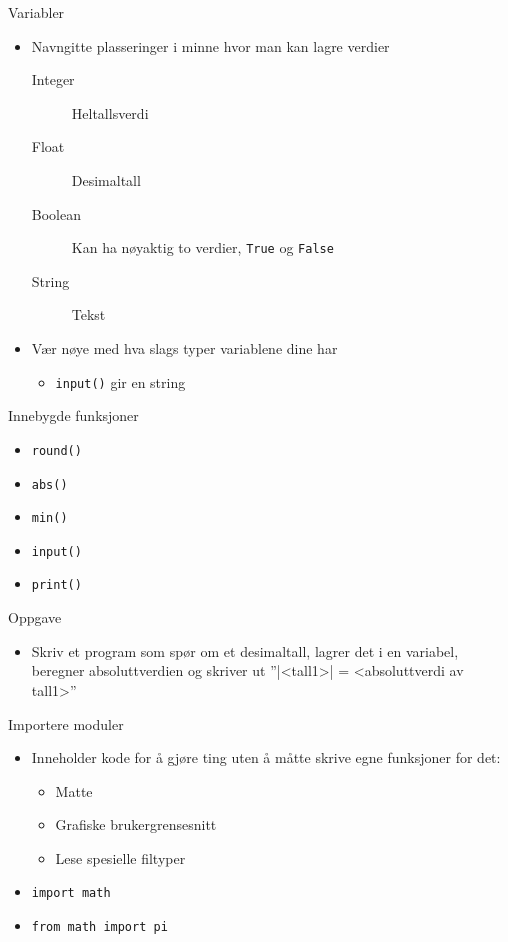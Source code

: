 \documentclass[screen, aspectratio=169]{beamer}
\begin{document}
\begin{frame}[fragile]{Variabler}
	\begin{itemize}
		\item Navngitte plasseringer i minne hvor man kan lagre verdier
		\begin{description}
			\item[Integer] Heltallsverdi
			\item[Float] Desimaltall
			\item[Boolean] Kan ha nøyaktig to verdier, \lstinline|True| og \lstinline|False|
			\item[String] Tekst
		\end{description}
		\item Vær nøye med hva slags typer variablene dine har
		\begin{itemize}
			\item \lstinline|input()| gir en string
		\end{itemize}
	\end{itemize}
\end{frame}

\begin{frame}[fragile]{Innebygde funksjoner}
	\begin{itemize}
		\item \lstinline|round()|
		\item \lstinline|abs()|
		\item \lstinline|min()|
		\item \lstinline|input()|
		\item \lstinline|print()|
	\end{itemize}
\end{frame}

\begin{frame}{Oppgave}
	\begin{itemize}
		\item Skriv et program som spør om et desimaltall, lagrer det i en variabel, beregner absoluttverdien og skriver ut ''|<tall1>| = <absoluttverdi av tall1>''
	\end{itemize}
\end{frame}

\begin{frame}{Importere moduler}
	\begin{itemize}
		\item Inneholder kode for å gjøre ting uten å måtte skrive egne funksjoner for det:
		\begin{itemize}
			\item Matte
			\item Grafiske brukergrensesnitt
			\item Lese spesielle filtyper
		\end{itemize}
		\item \lstinline|import math|
		\item \lstinline|from math import pi|
	\end{itemize}
\end{frame}
\end{document}

